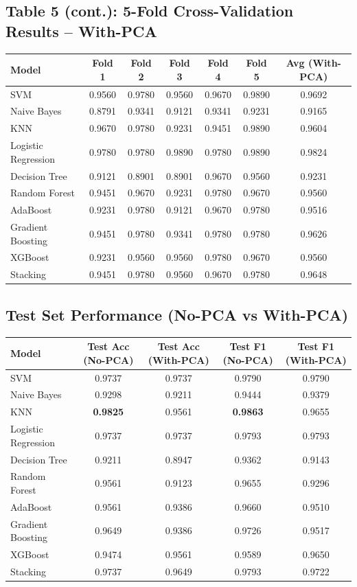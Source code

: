 \documentclass[12pt,a4paper]{article}
\begin{document}
\subsection*{Table 5 (cont.): 5-Fold Cross-Validation Results -- With-PCA}
\begin{longtable}{lcccccc}
\toprule
Model & Fold 1 & Fold 2 & Fold 3 & Fold 4 & Fold 5 & Avg (With-PCA)\\
\midrule
SVM & 0.9560 & 0.9780 & 0.9560 & 0.9670 & 0.9890 & 0.9692 \\
Naive Bayes & 0.8791 & 0.9341 & 0.9121 & 0.9341 & 0.9231 & 0.9165 \\
KNN & 0.9670 & 0.9780 & 0.9231 & 0.9451 & 0.9890 & 0.9604 \\
Logistic Regression & 0.9780 & 0.9780 & 0.9890 & 0.9780 & 0.9890 & 0.9824 \\
Decision Tree & 0.9121 & 0.8901 & 0.8901 & 0.9670 & 0.9560 & 0.9231 \\
Random Forest & 0.9451 & 0.9670 & 0.9231 & 0.9780 & 0.9670 & 0.9560 \\
AdaBoost & 0.9231 & 0.9780 & 0.9121 & 0.9670 & 0.9780 & 0.9516 \\
Gradient Boosting & 0.9451 & 0.9780 & 0.9341 & 0.9780 & 0.9780 & 0.9626 \\
XGBoost & 0.9231 & 0.9560 & 0.9560 & 0.9780 & 0.9670 & 0.9560 \\
Stacking & 0.9451 & 0.9780 & 0.9560 & 0.9670 & 0.9780 & 0.9648 \\
\bottomrule
\end{longtable}

\subsection*{Test Set Performance (No-PCA vs With-PCA)}
\begin{longtable}{lcccc}
\toprule
Model & Test Acc (No-PCA) & Test Acc (With-PCA) & Test F1 (No-PCA) & Test F1 (With-PCA)\\
\midrule
SVM & 0.9737 & 0.9737 & 0.9790 & 0.9790 \\
Naive Bayes & 0.9298 & 0.9211 & 0.9444 & 0.9379 \\
KNN & \textbf{0.9825} & 0.9561 & \textbf{0.9863} & 0.9655 \\
Logistic Regression & 0.9737 & 0.9737 & 0.9793 & 0.9793 \\
Decision Tree & 0.9211 & 0.8947 & 0.9362 & 0.9143 \\
Random Forest & 0.9561 & 0.9123 & 0.9655 & 0.9296 \\
AdaBoost & 0.9561 & 0.9386 & 0.9660 & 0.9510 \\
Gradient Boosting & 0.9649 & 0.9386 & 0.9726 & 0.9517 \\
XGBoost & 0.9474 & 0.9561 & 0.9589 & 0.9650 \\
Stacking & 0.9737 & 0.9649 & 0.9793 & 0.9722 \\
\bottomrule
\end{longtable}
\end{document}
